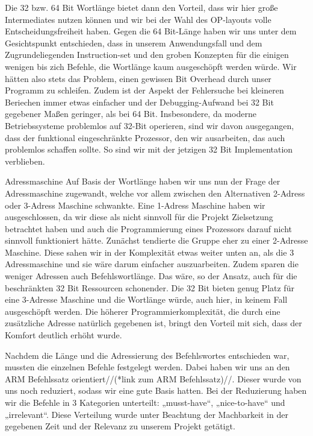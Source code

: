 \documentclass[paper=a4,fontsize=12pt]{scrreprt}
\begin{document}
Die 32 bzw. 64 Bit Wortlänge bietet dann den Vorteil, dass wir hier große Intermediates nutzen können und wir bei der Wahl des OP-layouts volle Entscheidungsfreiheit haben. 
Gegen die 64 Bit-Länge haben wir uns unter dem Gesichtspunkt entschieden, dass in unserem Anwendungsfall und dem Zugrundeliegenden Instruction-set und den groben Konzepten für die einigen wenigen bis zich Befehle, die Wortlänge kaum ausgeschöpft werden würde. Wir hätten also stets das Problem, einen gewissen Bit Overhead durch unser Programm zu schleifen. Zudem ist der Aspekt der Fehlersuche bei kleineren Beriechen immer etwas einfacher und der Debugging-Aufwand bei 32 Bit gegebener Maßen geringer, als bei 64 Bit.
Insbesondere, da moderne Betriebssysteme problemlos auf 32-Bit operieren, sind wir davon ausgegangen, dass der funktional eingeschränkte Prozessor, den wir ausarbeiten, das auch problemlos schaffen sollte. So sind wir mit der jetzigen 32 Bit Implementation verblieben.

Adressmaschine
Auf Basis der Wortlänge haben wir uns nun der Frage der Adressmaschine zugewandt, welche vor allem zwischen den Alternativen 2-Adress oder 3-Adress Maschine schwankte. Eine 1-Adress Maschine haben wir ausgeschlossen, da wir diese als nicht sinnvoll für die Projekt Zielsetzung betrachtet haben und auch die Programmierung eines Prozessors darauf nicht sinnvoll funktioniert hätte.
Zunächst tendierte die Gruppe eher zu einer 2-Adresse Maschine. Diese sahen wir in der Komplexität etwas weiter unten an, als die 3 Adressmaschine und sie wäre darum einfacher auszuarbeiten. Zudem sparen die weniger Adressen auch Befehlswortlänge. Das wäre, so der Ansatz, auch für die beschränkten 32 Bit Ressourcen schonender.
Die 32 Bit bieten genug Platz für eine 3-Adresse Maschine und die Wortlänge würde, auch hier, in keinem Fall ausgeschöpft werden.
Die höherer Programmierkomplexität, die durch eine zusätzliche Adresse natürlich gegebenen ist, bringt den Vorteil mit sich, dass der Komfort deutlich erhöht wurde.

Nachdem die Länge und die Adressierung des Befehlswortes entschieden war, mussten die einzelnen Befehle festgelegt werden. Dabei haben wir uns an den ARM Befehlssatz orientiert//(*link zum ARM Befehlssatz)//. Dieser wurde von uns noch reduziert, sodass wir eine gute Basis hatten. Bei der Reduzierung haben wir die Befehle in 3 Kategorien unterteilt: „musst-have“, „nice-to-have“ und „irrelevant“.  Diese Verteilung wurde unter Beachtung der Machbarkeit in der gegebenen Zeit und der Relevanz zu unserem Projekt getätigt.
\end{document}

